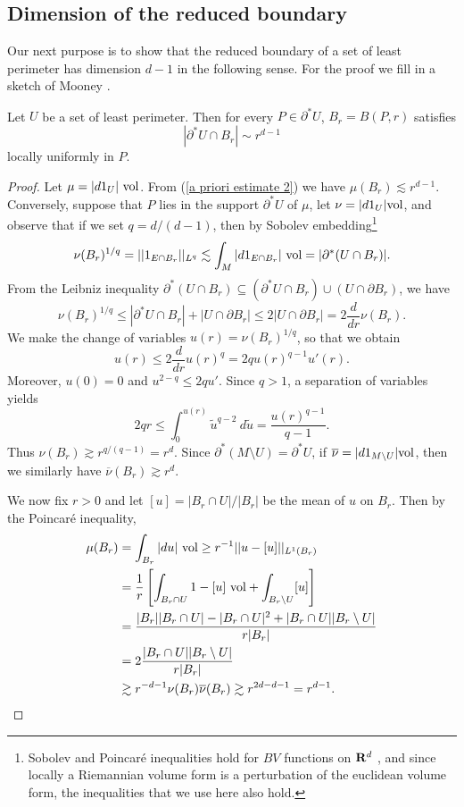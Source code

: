 
\subsection{Dimension of the reduced boundary}
Our next purpose is to show that the reduced boundary of a set of least perimeter has dimension $d - 1$ in the following sense.
For the proof we fill in a sketch of Mooney \cite[Theorem 12]{Mooney11}.

\begin{proposition}\label{doubling dimension}
Let $U$ be a set of least perimeter. Then for every $P \in \partial^* U$, $B_r = B(P, r)$ satisfies
$$|\partial^* U \cap B_r| \sim r^{d - 1}$$
locally uniformly in $P$.
\end{proposition}
\begin{proof}
Let $\mu =|d1_U| ~\mathrm{vol}$. From (\ref{a priori estimate 2}) we have $\mu(B_r) \lesssim r^{d - 1}$.
Conversely, suppose that $P$ lies in the support $\partial^* U$ of $\mu$, let $\nu = |d1_U|\mathrm{vol}$, and observe that if we set $q = d/(d - 1)$, then by Sobolev embedding\footnote{Sobolev and Poincar\'e inequalities hold for $BV$ functions on $\mathbf{R}^d$ \cite[\S5.6.1]{evans1991measure},
and since locally a Riemannian volume form is a perturbation of the euclidean volume form, the inequalities that we use here also hold.}
$$\nu(B_r)^{1/q} = ||1_{E \cap B_r}||_{L^q} \lesssim \int_M |d1_{E \cap B_r}| ~\mathrm{vol} = |\partial^*(U \cap B_r)|.$$
From the Leibniz inequality $\partial^*(U \cap B_r) \subseteq (\partial^* U \cap B_r) \cup (U \cap \partial B_r)$, we have
$$\nu(B_r)^{1/q} \leq |\partial^* U \cap B_r| + |U \cap \partial B_r| \leq 2|U \cap \partial B_r| = 2\frac{d}{dr} \nu(B_r).$$
We make the change of variables $u(r) = \nu(B_r)^{1/q}$, so that we obtain
$$u(r) \leq 2 \frac{d}{dr} u(r)^q = 2qu(r)^{q - 1}u'(r).$$
Moreover, $u(0) = 0$ and $u^{2 - q} \leq 2qu'$.
Since $q > 1$, a separation of variables yields
$$2qr \leq \int_0^{u(r)} \tilde u^{q - 2}~d\tilde u = \frac{u(r)^{q - 1}}{q - 1}.$$
Thus $\nu(B_r) \gtrsim r^{q/(q - 1)} = r^d$.
Since $\partial^* (M \setminus U) = \partial^* U$, if $\overline{\nu} = |d1_{M \setminus U}|\mathrm{vol}$, then we similarly have $\overline{\nu}(B_r) \gtrsim r^d$.

We now fix $r > 0$ and let $[u] = |B_r \cap U|/|B_r|$ be the mean of $u$ on $B_r$. Then by the Poincar\'e inequality,
\begin{align*}
\mu(B_r) &= \int_{B_r} |du|~\mathrm{vol} \geq r^{-1} ||u - [u]||_{L^1(B_r)} \\
&= \frac{1}{r} \left[\int_{B_r \cap U} 1 -[u] ~\mathrm{vol} + \int_{B_r \setminus U} [u] \right] \\
&= \frac{|B_r||B_r \cap U| - |B_r \cap U|^2 + |B_r \cap U||B_r \setminus U|}{r|B_r|} \\
&= 2\frac{|B_r \cap U||B_r \setminus U|}{r|B_r|}\\
&\gtrsim r^{-d-1} \nu(B_r) \overline{\nu}(B_r) \gtrsim r^{2d-d-1} = r^{d - 1}. \qedhere
\end{align*}
\end{proof}

